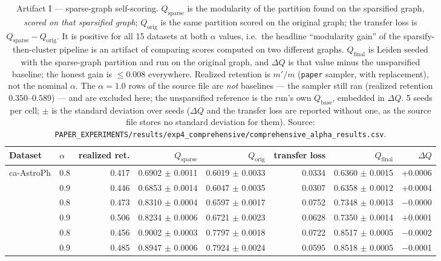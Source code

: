 \begin{table}[t]
\centering
\setlength{\tabcolsep}{5pt}
\caption{Artifact I --- sparse-graph self-scoring. $Q_{\mathrm{sparse}}$ is the modularity of the
partition found on the sparsified graph, \emph{scored on that sparsified graph}; $Q_{\mathrm{orig}}$
is the same partition scored on the original graph; the transfer loss is
$Q_{\mathrm{sparse}}-Q_{\mathrm{orig}}$. It is positive for all 15 datasets at both $\alpha$ values,
i.e.\ the headline ``modularity gain'' of the sparsify-then-cluster pipeline is an artifact of
comparing scores computed on two different graphs. $Q_{\mathrm{final}}$ is Leiden seeded with the
sparse-graph partition and run on the original graph, and $\Delta Q$ is that value minus the
unsparsified baseline; the honest gain is $\le 0.008$ everywhere.
Realized retention is $m'/m$ (\texttt{paper} sampler, with replacement), not the nominal $\alpha$.
The $\alpha=1.0$ rows of the source file are \emph{not} baselines --- the sampler still ran
(realized retention $0.350$--$0.589$) --- and are excluded here; the unsparsified reference is the
run's own $Q_{\mathrm{base}}$, embedded in $\Delta Q$.
5 seeds per cell; $\pm$ is the standard deviation over seeds ($\Delta Q$ and the transfer loss are
reported without one, as the source file stores no standard deviation for them).
Source: \texttt{PAPER\_EXPERIMENTS/results/exp4\_comprehensive/comprehensive\_alpha\_results.csv}.}
\label{tab:transfer_loss}
\footnotesize
\begin{tabular}{llrrrrrr}
\toprule
Dataset & $\alpha$ & realized ret. & $Q_{\mathrm{sparse}}$ & $Q_{\mathrm{orig}}$
 & transfer loss & $Q_{\mathrm{final}}$ & $\Delta Q$ \\
\midrule
\multirow{2}{*}{ca-AstroPh} & 0.8 & 0.417 & 0.6902 $\pm$ 0.0011 & 0.6019 $\pm$ 0.0033 & 0.0334 & 0.6360 $\pm$ 0.0015 & +0.0006 \\
 & 0.9 & 0.446 & 0.6853 $\pm$ 0.0014 & 0.6047 $\pm$ 0.0035 & 0.0307 & 0.6358 $\pm$ 0.0012 & +0.0004 \\
\addlinespace[2pt]
\multirow{2}{*}{ca-CondMat} & 0.8 & 0.473 & 0.8310 $\pm$ 0.0004 & 0.6597 $\pm$ 0.0017 & 0.0752 & 0.7348 $\pm$ 0.0013 & $-$0.0000 \\
 & 0.9 & 0.506 & 0.8234 $\pm$ 0.0006 & 0.6721 $\pm$ 0.0023 & 0.0628 & 0.7350 $\pm$ 0.0014 & +0.0001 \\
\addlinespace[2pt]
\multirow{2}{*}{ca-GrQc} & 0.8 & 0.456 & 0.9002 $\pm$ 0.0003 & 0.7797 $\pm$ 0.0018 & 0.0722 & 0.8517 $\pm$ 0.0005 & $-$0.0002 \\
 & 0.9 & 0.485 & 0.8947 $\pm$ 0.0006 & 0.7924 $\pm$ 0.0024 & 0.0595 & 0.8518 $\pm$ 0.0005 & $-$0.0001 \\

\end{tabular}
\end{table}
